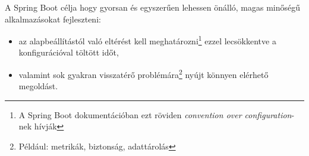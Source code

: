 A Spring Boot \cite{introducing_spring_boot} célja hogy gyorsan és egyszerűen lehessen önálló, magas minőségű alkalmazásokat fejleszteni:
\begin{itemize}
	\item az alapbeállítástól való eltérést kell meghatározni\footnote{A Spring Boot dokumentációban ezt röviden \textit{convention over configuration}-nek hívják} ezzel lecsökkentve a konfigurációval töltött időt,
	\item valamint sok gyakran visszatérő problémára\footnote{Például: metrikák, biztonság, adattárolás} nyújt könnyen elérhető megoldást.
\end{itemize}



